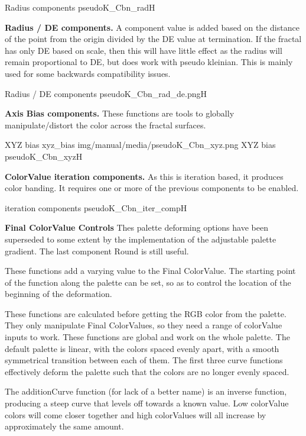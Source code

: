 {Radius components}
{pseudoK_Cbn_rad}{H}

\textbf{Radius / DE components.} A component value is added based on the distance of the point from the origin divided by the DE value at termination. If the fractal has only DE based on scale, then this will have little effect as the radius will remain proportional to DE, but does work with pseudo kleinian. This is mainly used for some backwards compatibility issues.

{Radius / DE components}
{pseudoK_Cbn_rad_de.png}{H}

\textbf{Axis Bias components.} These functions are tools to globally manipulate/distort the color across the fractal surfaces.
 
{XYZ bias}
{xyz_bias}
{img/manual/media/pseudoK_Cbn_xyz.png}
{XYZ bias}
{pseudoK_Cbn_xyz}{H}

\textbf{ColorValue iteration components.} As this is iteration based, it produces color banding. It requires one or more of the previous components to be enabled.

{iteration components}
{pseudoK_Cbn_iter_comp}{H}

\textbf{Final ColorValue Controls}
Thes palette deforming options have been superseded to some extent by the implementation of the adjustable palette gradient. The last component Round is still useful.

These functions add a varying value to the Final ColorValue. The starting point of the function along the palette can be set, so as to control the location of the beginning of the deformation.

These functions are calculated before getting the RGB color from the palette. They only manipulate Final ColorValues, so they need a range of colorValue inputs to work. These functions are global and work on the whole palette. The default palette is linear, with the colors spaced evenly apart, with a smooth symmetrical transition between each of them. The first three curve functions effectively deform the palette such that the colors are no longer evenly spaced.

The additionCurve function (for lack of a better name) is an inverse function, producing a steep curve that levels off towards a known value. Low colorValue colors will come closer together and high colorValues will all increase by approximately the same amount.

